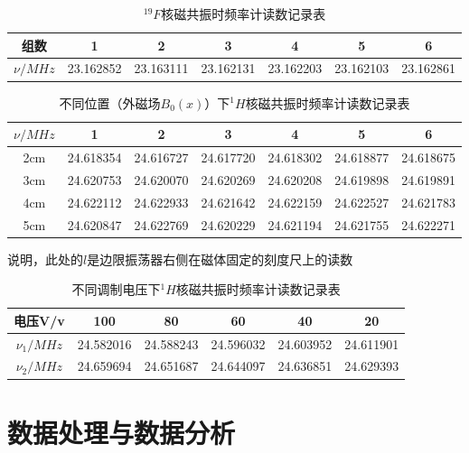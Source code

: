 \documentclass[a4paper,UTF8]{ctexart}
\begin{document}
\begin{table}[H]
    \centering
    \begin{tabular}{|c|c|c|c|c|c|c|}
    \hline
        组数 & 1 & 2 & 3 & 4 & 5 & 6 \\ \hline
        $\nu /MHz$ & 23.162852 & 23.163111 & 23.162131 & 23.162203 & 23.162103 & 23.162861 \\ \hline
    \end{tabular}
    \caption{$^{19}F$核磁共振时频率计读数记录表}
\end{table}

\begin{table}[H]
    \centering
    \begin{tabular}{|c|c|c|c|c|c|c|}
    \hline
        $\nu /MHz$ & 1 & 2 & 3 & 4 & 5 & 6 \\ \hline
        2cm & 24.618354 & 24.616727 & 24.617720 & 24.618302 & 24.618877 & 24.618675 \\ \hline
        3cm & 24.620753 & 24.620070 & 24.620269 & 24.620208 & 24.619898 & 24.619891 \\ \hline
        4cm & 24.622112 & 24.622933 & 24.621642 & 24.622159 & 24.622527 & 24.621783 \\ \hline
        5cm & 24.620847 & 24.622769 & 24.620229 & 24.621194 & 24.621755 & 24.622271 \\ \hline
    \end{tabular}
    \caption{不同位置（外磁场$B_0(x)$）下$^1H$核磁共振时频率计读数记录表}
\end{table}

说明，此处的$l$是边限振荡器右侧在磁体固定的刻度尺上的读数

\begin{table}[H]
    \centering
    \begin{tabular}{|c|c|c|c|c|c|}
    \hline
        电压V/v & 100 & 80 & 60 & 40 & 20 \\ \hline
        $\nu_1 /MHz$ & 24.582016 & 24.588243 & 24.596032 & 24.603952 & 24.611901 \\ \hline
        $\nu_2 /MHz$ & 24.659694 & 24.651687 & 24.644097 & 24.636851 & 24.629393 \\ \hline
    \end{tabular}
    \caption{不同调制电压下$^1H$核磁共振时频率计读数记录表}
\end{table}

\section{数据处理与数据分析}
\end{document}
